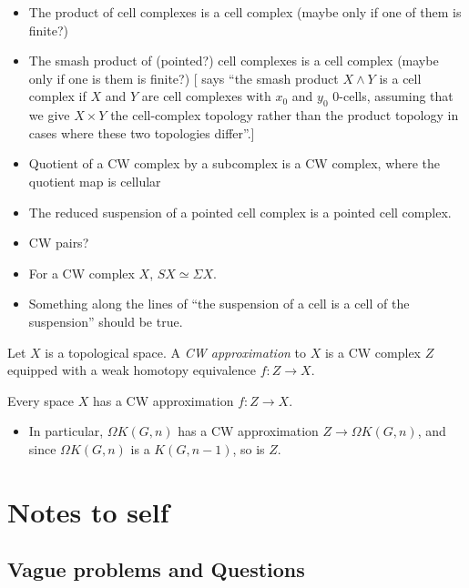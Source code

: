 \documentclass{MetricNotes2023}
\begin{document}
\begin{itemize}
\item The product of cell complexes is a cell complex (maybe only if one of them is finite?)
\item The smash product of (pointed?) cell complexes is a cell complex (maybe only if one is them is finite?) [\autocite{hatcher} says ``the smash product \(X\wedge Y\) is a cell complex if \(X\) and \(Y\) are cell complexes with \(x_0\) and \(y_0\) \(0\)-cells, assuming that we give \(X\times Y\) the cell-complex topology rather than the product topology in cases where these two topologies differ''.]
\item Quotient of a CW complex by a subcomplex is a CW complex, where the quotient map is cellular
\item The reduced suspension of a pointed cell complex is a pointed cell complex.
\item CW pairs?
\item For a CW complex \(X\), \(SX\simeq \Sigma X\).
\item Something along the lines of ``the suspension of a cell is a cell of the suspension'' should be true.
\end{itemize}

\begin{definition}
Let \(X\) is a topological space. A \textit{CW approximation} to \(X\) is a CW complex \(Z\) equipped with a weak homotopy equivalence \(f : Z \to X\).
\end{definition}

\begin{theorem}
Every space \(X\) has a CW approximation \(f : Z \to X\). %
\end{theorem}

\begin{itemize}
\item In particular, \(\Omega K(G, n)\) has a CW approximation \(Z \to \Omega K(G, n)\), and since \(\Omega K(G,n)\) is a \(K(G,n-1)\), so is \(Z\). 
\end{itemize}

\section{Notes to self}\label{C}

\subsection{Vague problems and Questions}
\end{document}
